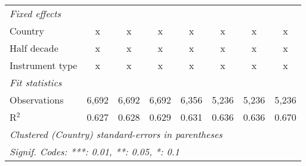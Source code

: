 \begin{table}[htbp]
\begin{tabular}{lccccccc}
      \emph{Fixed effects}\\
      Country                                                                                  & x            & x             & x             & x             & x             & x             & x\\  
      Half decade                                                                              & x            & x             & x             & x             & x             & x             & x\\  
      Instrument type                                                                          & x            & x             & x             & x             & x             & x             & x\\  
      \midrule \emph{Fit statistics}\\
      Observations                                                                             & 6,692        & 6,692         & 6,692         & 6,356         & 5,236         & 5,236         & 5,236\\  
      R$^2$                                                                                    & 0.627        & 0.628         & 0.629         & 0.631         & 0.636         & 0.636         & 0.670\\  
      \midrule
      \multicolumn{8}{l}{\emph{Clustered (Country) standard-errors in parentheses}}\\
      \multicolumn{8}{l}{\emph{Signif. Codes: ***: 0.01, **: 0.05, *: 0.1}}\\
   \end{tabular}
\end{table}


